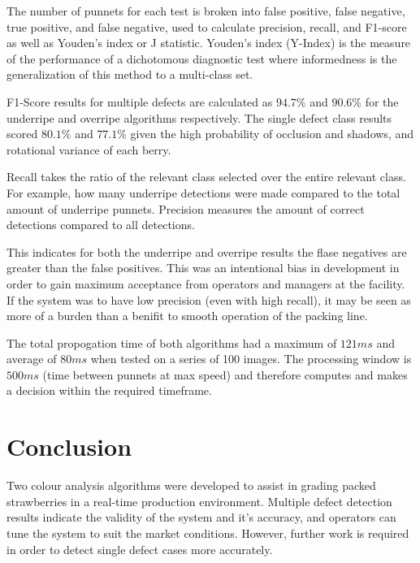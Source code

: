 \documentclass[conference]{IEEEtran}
\begin{document}
The number of punnets for each test is broken into false positive, false negative, true positive, and false negative, used to calculate precision, recall, and F1-score as well as Youden's index or J statistic. Youden's index (Y-Index) is the measure of the performance of a dichotomous diagnostic test where informedness is the generalization of this method to a multi-class set.

F1-Score results for multiple defects are calculated as $94.7\%$ and $90.6\%$ for the underripe and overripe algorithms respectively. The single defect class results scored $80.1\%$ and $77.1\%$ given the high probability of occlusion and shadows, and rotational variance of each berry.

Recall takes the ratio of the relevant class selected over the entire relevant class. For example, how many underripe detections were made compared to the total amount of underripe punnets. Precision measures the amount of correct detections compared to all detections. 

This indicates for both the underripe and overripe results the flase negatives are greater than the false positives. This was an intentional bias in development in order to gain maximum acceptance from operators and managers at the facility. If the system was to have low precision (even with high recall), it may be seen as more of a burden than a benifit to smooth operation of the packing line.

The total propogation time of both algorithms had a maximum of $121ms$ and average of $80ms$ when tested on a series of 100 images. The processing window is $500ms$ (time between punnets at max speed) and therefore computes and makes a decision within the required timeframe.




\section{Conclusion}

Two colour analysis algorithms were developed to assist in grading packed strawberries in a real-time production environment. Multiple defect detection results indicate the validity of the system and it's accuracy, and operators can tune the system to suit the market conditions. However, further work is required in order to detect single defect cases more accurately. 
\end{document}

